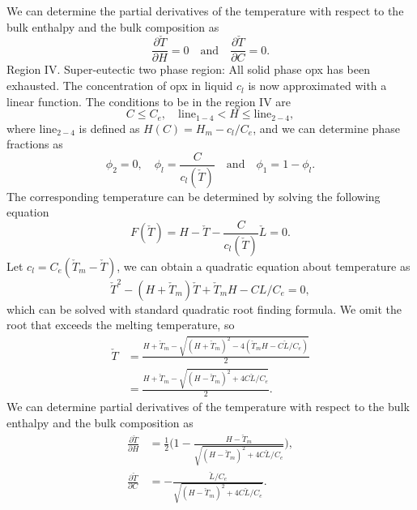 We can determine the partial derivatives of the temperature with respect to the bulk enthalpy and the bulk composition as
\begin{equation}
\frac{\partial\check{T}}{\partial H} = 0 \quad \text{and} \quad \frac{\partial\check{T}}{\partial C} = 0.
\end{equation}
Region IV. Super-eutectic two phase region: All solid phase opx has
been exhausted. The concentration of opx
in liquid $c_{l}$ is now approximated with
a linear function.
The conditions to be in the region IV are
\begin{equation}
		  C \leq C_e, \quad
		  \text{line}_{1-4} < H \leq \text{line}_{2-4},
\end{equation}
where $\text{line}_{2-4}$ is defined as $H(C) = H_m - c_l/C_e$,
and we can determine phase fractions as 
\begin{equation}
    \phi_2 = 0, \quad \phi_l = \frac{C}{c_l(\check{T})} \quad \text{and} \quad \phi_1 = 1- \phi_l.
\end{equation}
The corresponding temperature can be determined by solving the following equation
\begin{equation}
F(\check{T}) = H - \check{T} - 
		  \frac{C}{c_l(\check{T})} \check{L} = 0. 
\end{equation}
Let $c_l = C_e (\check{T}_m - \check{T})$,   
we can obtain a quadratic equation about temperature as
\begin{equation}
		  \check{T}^2 - (H + \check{T}_m)\check{T} + 
		  \check{T}_m H - C L/C_e = 0,
\end{equation}
which can be solved with standard quadratic root finding formula.
We omit the root that exceeds the melting temperature, so
\begin{equation}
		  \begin{aligned}
		  \check{T} &= \frac{H + \check{T}_m - 
		  \sqrt{ (H + \check{T}_m)^2 - 
		  4(\check{T}_m H - C \check{L}/C_e)} }{2} \\
					  &= 
		  \frac{H + \check{T}_m - 
		  \sqrt{ (H - \check{T}_m)^2 + 
		  4C \check{L}/C_e} }{2}. 
		  \end{aligned}
\end{equation}
We can determine partial derivatives of the temperature with respect to the bulk enthalpy and the bulk composition as
\begin{equation}
\begin{aligned}
\frac{\partial\check{T}}{\partial H} &= \frac{1}{2}\Bigg(1- \frac{H - \check{T}_m}{\sqrt{(H - \check{T}_m)^2 + 4C\check{L}/C_e}}\Bigg), \\
\frac{\partial\check{T}}{\partial C} &= -\frac{\check{L}/C_e}{\sqrt{(H - \check{T}_m)^2 + 4C\check{L}/C_e}}.
\end{aligned}
\end{equation}

